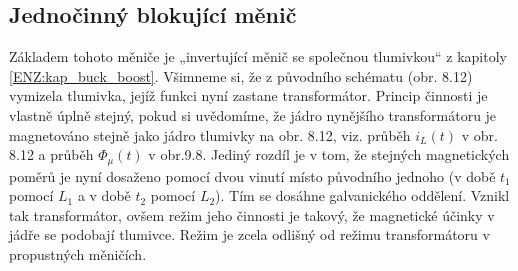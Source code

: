   \subsection{Jednočinný blokující měnič}
    Základem tohoto měniče je „invertující měnič se společnou tlumivkou“ z kapitoly
    \ref{ENZ:kap_buck_boost}. Všimneme si, že z původního schématu (obr. 8.12) vymizela tlumivka,
    jejíž funkci nyní zastane transformátor. Princip činnosti je vlastně úplně stejný, pokud si
    uvědomíme, že jádro nynějšího transformátoru je magnetováno stejně jako jádro tlumivky na obr. 
    8.12, viz. průběh $i_L(t)$ v obr. 8.12 a průběh $\Phi_\mu(t)$ v obr.9.8. Jediný rozdíl je v tom, 
    že stejných magnetických poměrů je nyní dosaženo pomocí dvou vinutí místo původního jednoho (v 
    době $t_1$ pomocí $L_1$ a v době $t_2$ pomocí $L_2$). Tím se dosáhne galvanického oddělení. 
    Vznikl tak transformátor, ovšem režim jeho činnosti je takový, že magnetické účinky v jádře se 
    podobají tlumivce. Režim je zcela odlišný od režimu transformátoru v propustných měničích.
